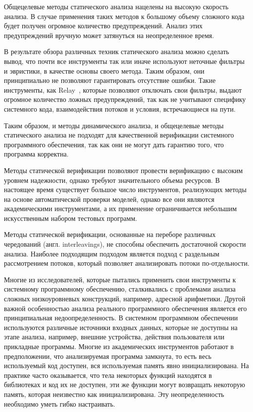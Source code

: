 Общецелевые методы статического анализа нацелены на высокую скорость анализа.
В случае применения таких методов к большому объему сложного кода будет получен огромное количество предупреждений.
Анализ этих предупреждений вручную может затянуться на неопределенное время.

В результате обзора различных техник статического анализа можно сделать вывод, что почти все инструменты так или иначе используют неточные фильтры и эвристики, в качестве основы своего метода.
Таким образом, они принципиально не позволяют гарантировать отсутствие ошибки.
Такие инструменты, как Relay~\cite{Relay}, которые позволяют отключать свои фильтры, выдают огромное количество ложных предупреждений, так как не учитывают специфику системного кода, взаимодействия потоков и условия, встречающиеся на пути.

Таким образом, и методы динамического анализа, и общецелевые методы статического анализа не подходят для качественной верификации системного программного обеспечения, так как они не могут дать гарантию того, что программа корректна.

Методы статической верификации позволяют провести верификацию с высоким уровнем надежности, однако требуют значительного объема ресурсов. 
В настоящее время существует большое число инструментов, реализующих методы на основе автоматической проверки моделей, однако все они являются академическими инструментами, а их применение ограничивается небольшим искусственным набором тестовых программ.

Методы статической верификации, основанные на переборе различных чередований (англ. interleavings), не способны обеспечить достаточной скорости анализа. 
Наиболее подходящим подходом является подход с раздельным рассмотрением потоков, который позволяет анализировать потоки по-отдельности. 

Многие из исследователей, которые пытались применить свои инструменты к системному программному обеспечению, сталкивались с проблемами анализа сложных низкоуровневых конструкций, например, адресной арифметики.
Другой важной особенностью анализа реального программного обеспечения является его принципиальная недоопределенность.
В системном программном обеспечении используются различные источники входных данных, которые не доступны на этапе анализа, например, внешние устройства, действия пользователя или прикладные программы. 
Многие из академических инструментов работают в предположении, что анализируемая программа замкнута, то есть весь используемый код доступен, вся используемая память явно инициализирована.
На практике часто оказывается, что тела некоторых функций находятся в библиотеках и код их не доступен, эти же функции могут возвращать некоторую память, которая неизвестно как инициализирована.
Эту неопределенность необходимо уметь гибко настраивать. 

